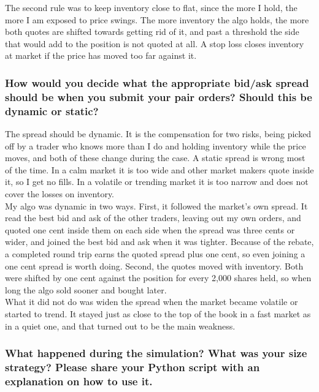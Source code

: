 \documentclass{article}
\begin{document}
\noindent The second rule was to keep inventory close to flat, since the more I hold, the more I am exposed to price swings. The more inventory the algo holds, the more both quotes are shifted towards getting rid of it, and past a threshold the side that would add to the position is not quoted at all. A stop loss closes inventory at market if the price has moved too far against it.

\subsubsection{How would you decide what the appropriate bid/ask spread should be when you submit your pair orders? Should this be dynamic or static?}

The spread should be dynamic. It is the compensation for two risks, being picked off by a trader who knows more than I do and holding inventory while the price moves, and both of these change during the case. A static spread is wrong most of the time. In a calm market it is too wide and other market makers quote inside it, so I get no fills. In a volatile or trending market it is too narrow and does not cover the losses on inventory.\\

\noindent My algo was dynamic in two ways. First, it followed the market's own spread. It read the best bid and ask of the other traders, leaving out my own orders, and quoted one cent inside them on each side when the spread was three cents or wider, and joined the best bid and ask when it was tighter. Because of the rebate, a completed round trip earns the quoted spread plus one cent, so even joining a one cent spread is worth doing. Second, the quotes moved with inventory. Both were shifted by one cent against the position for every 2{,}000 shares held, so when long the algo sold sooner and bought later.\\

\noindent What it did not do was widen the spread when the market became volatile or started to trend. It stayed just as close to the top of the book in a fast market as in a quiet one, and that turned out to be the main weakness.

\subsubsection{What happened during the simulation? What was your size strategy? Please share your Python script with an explanation on how to use it.}
\end{document}
